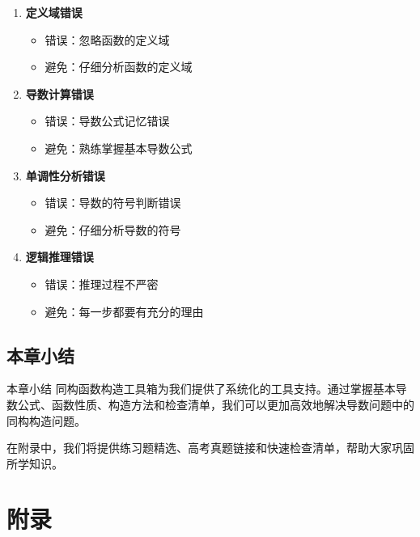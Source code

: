 \documentclass[a4paper,11pt]{ctexrep}
\theoremstyle{definition}
\begin{document}
\begin{warningbox}[常见错误与避免方法]
\begin{enumerate}
    \item \textbf{定义域错误}
    \begin{itemize}
        \item 错误：忽略函数的定义域
        \item 避免：仔细分析函数的定义域
    \end{itemize}
    
    \item \textbf{导数计算错误}
    \begin{itemize}
        \item 错误：导数公式记忆错误
        \item 避免：熟练掌握基本导数公式
    \end{itemize}
    
    \item \textbf{单调性分析错误}
    \begin{itemize}
        \item 错误：导数的符号判断错误
        \item 避免：仔细分析导数的符号
    \end{itemize}
    
    \item \textbf{逻辑推理错误}
    \begin{itemize}
        \item 错误：推理过程不严密
        \item 避免：每一步都要有充分的理由
    \end{itemize}
\end{enumerate}
\end{warningbox}

\section{本章小结}

\begin{summarybox}{本章小结}
同构函数构造工具箱为我们提供了系统化的工具支持。通过掌握基本导数公式、函数性质、构造方法和检查清单，我们可以更加高效地解决导数问题中的同构构造问题。

在附录中，我们将提供练习题精选、高考真题链接和快速检查清单，帮助大家巩固所学知识。
\end{summarybox}

\appendix

\chapter{附录}
\end{document}
